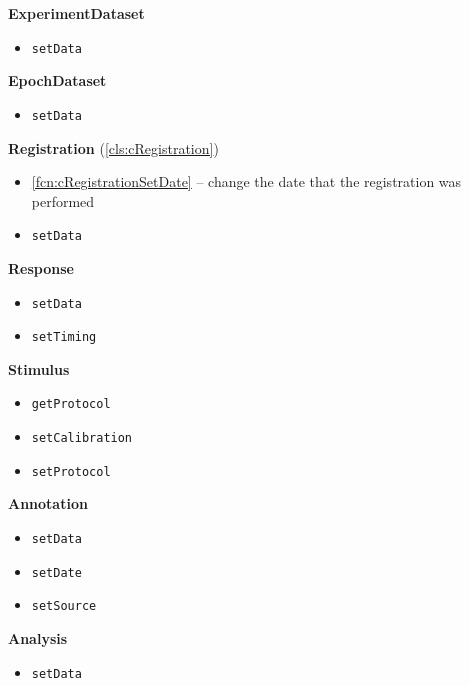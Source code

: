 \documentclass{aodatadocs}
\newcommand{\ret}[1]{\textcolor{purple5}{\texttt{#1}}}
\begin{document}
{\begin{legal}[font=\Large\bfseries, itemsep=1.5ex]
\begin{legal}[font=\large\bfseries, itemsep=1ex]
\begin{itemize}
            \end{itemize}
        \item {\large\textbf{ExperimentDataset}}
            \begin{itemize}
                \item \ret{setData}
            \end{itemize}
        \item {\large\textbf{EpochDataset}}
            \begin{itemize}
                \item \ret{setData}
            \end{itemize}
        \item {\large\textbf{Registration} (\ref{cls:cRegistration})}
            \begin{itemize}
                \item \ref{fcn:cRegistrationSetDate} -- change the date that the registration was performed
                \item \ret{setData}
            \end{itemize}
        \item {\large\textbf{Response}}
            \begin{itemize}
                \item \ret{setData}
                \item \ret{setTiming}
            \end{itemize}
        \item {\large\textbf{Stimulus}}
            \begin{itemize}
                \item \ret{getProtocol}
                \item \ret{setCalibration}
                \item \ret{setProtocol}
            \end{itemize}
        \item {\large\textbf{Annotation}}
            \begin{itemize}
                \item \ret{setData}
                \item \ret{setDate}
                \item \ret{setSource}
            \end{itemize}
        \item {\large\textbf{Analysis}}
            \begin{itemize}
                \item \ret{setData}

\end{itemize}
\end{legal}
\end{legal}}
\end{document}
